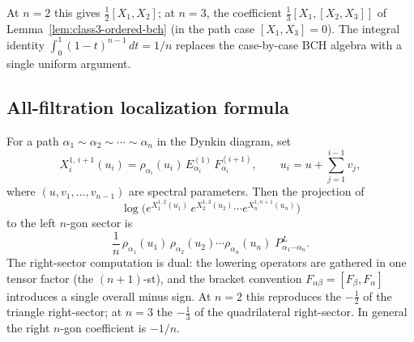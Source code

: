 \begin{remark}
At $n=2$ this gives $\frac12[X_1,X_2]$; at $n=3$, the coefficient
$\frac13[X_1,[X_2,X_3]]$ of Lemma~\ref{lem:class3-ordered-bch}
(in the path case $[X_1,X_3]=0$). The integral identity
$\int_0^1(1-t)^{n-1}\,dt=1/n$ replaces the case-by-case BCH algebra
with a single uniform argument.
\end{remark}

\subsection{All-filtration localization formula}

\begin{theorem}
\label{thm:ngon-localization}
For a path $\alpha_1\sim\alpha_2\sim\cdots\sim\alpha_n$ in the Dynkin
diagram, set
\[
X_i^{1,\,i+1}(u_i)
=
\rho_{\alpha_i}(u_i)\,E_{\alpha_i}^{(1)}\,F_{\alpha_i}^{(i+1)},
\qquad
u_i = u + \textstyle\sum_{j=1}^{i-1}v_j,
\]
where $(u,v_1,\ldots,v_{n-1})$ are spectral parameters. Then the
projection of
\[
\log\!\Big(e^{X_1^{1,2}(u_1)}\,e^{X_2^{1,3}(u_2)}\cdots
e^{X_n^{1,n+1}(u_n)}\Big)
\]
to the left $n$-gon sector is
\begin{equation}\label{eq:ngon-left}
\frac{1}{n}\,
\rho_{\alpha_1}(u_1)\,\rho_{\alpha_2}(u_2)\cdots\rho_{\alpha_n}(u_n)
\;P_{\alpha_1\cdots\alpha_n}^{L}.
\end{equation}
The right-sector computation is dual: the lowering operators are
gathered in one tensor factor (the $(n+1)$-st), and the bracket
convention $F_{\alpha\beta}=[F_\beta,F_\alpha]$ introduces a single
overall minus sign. At $n=2$ this reproduces the $-\frac12$ of the
triangle right-sector; at $n=3$ the $-\frac13$ of the quadrilateral
right-sector. In general the right $n$-gon coefficient is $-1/n$.
\end{theorem}

